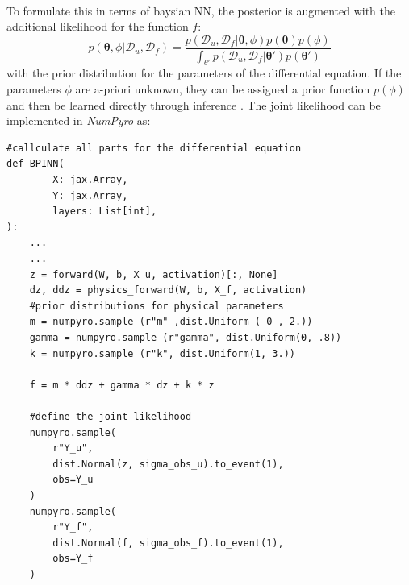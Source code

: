 \documentclass{article}
\begin{document}
\\
To formulate this in terms of baysian NN, the posterior is augmented with the additional likelihood for the function $f$:
\begin{equation} \label{eq:post_params_BPINN}
    p(\bm \theta, \phi|\mathcal{D}_u, \mathcal{D}_f) = \frac{p(\mathcal{D}_u, \mathcal{D}_f|\bm \theta, \phi)p(\bm \theta)p(\phi)}{\int_{\theta'}p(\mathcal{D}_u, \mathcal{D}_f|\bm \theta')p(\bm \theta')}
\end{equation}
with the prior distribution for the parameters of the differential equation. If the parameters $\phi$ are a-priori unknown, they can be assigned a prior function $p(\phi)$ and then be learned directly through inference \cite{raissi2017physicsIDL, Yang_2021}.
The joint likelihood can be implemented in \textit{NumPyro} as:
\begin{lstlisting}[caption={Joint likelihood for B-PINN},captionpos=t]
#callculate all parts for the differential equation
def BPINN(
        X: jax.Array,
        Y: jax.Array,
        layers: List[int],
):
    ...
    ...
    z = forward(W, b, X_u, activation)[:, None]
    dz, ddz = physics_forward(W, b, X_f, activation)
    #prior distributions for physical parameters
    m = numpyro.sample (r"m" ,dist.Uniform ( 0 , 2.))
    gamma = numpyro.sample (r"gamma", dist.Uniform(0, .8))
    k = numpyro.sample (r"k", dist.Uniform(1, 3.))
        
    f = m * ddz + gamma * dz + k * z
    
    #define the joint likelihood
    numpyro.sample(
        r"Y_u", 
        dist.Normal(z, sigma_obs_u).to_event(1), 
        obs=Y_u
    )
    numpyro.sample(
        r"Y_f", 
        dist.Normal(f, sigma_obs_f).to_event(1), 
        obs=Y_f
    )
\end{lstlisting} 
\end{document}
